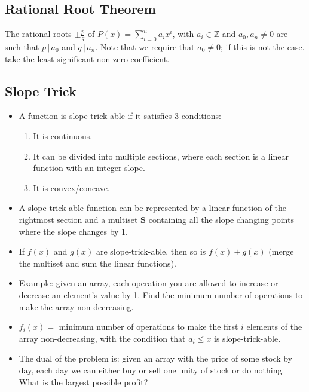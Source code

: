 \subsection{Rational Root Theorem}

The rational roots $\pm \frac p q$ of $P(x) = \sum_{i=0}^n a_i x^i$, with $a_i \in \mathbb Z$ and $a_0, a_n \neq 0$ are such that $p \,|\, a_0$ and $q \,|\, a_n$. Note that we require that $a_0 \neq 0$; if this is not the case. take the least significant non-zero coefficient.

\subsection{Slope Trick}

\begin{itemize}
    \item A function is slope-trick-able if it satisfies 3 conditions:


\begin{enumerate}
    \item It is continuous.
    \item It can be divided into multiple sections, where each section is a linear function with an integer slope.
    \item It is convex/concave. 
\end{enumerate}

\item A slope-trick-able function can be represented by a linear function of the rightmost section and a multiset \textbf{S} containing all the slope changing points where the slope changes by 1.

\item If $f(x)$ and $g(x)$ are slope-trick-able, then so is $f(x) + g(x)$ (merge the multiset and sum the linear functions).

\item Example: given an array, each operation you are allowed to increase or decrease an element's value by 1. Find the minimum number of operations to make the array non decreasing.   

\item $f_i(x) = $ minimum number of operations to make the first $i$ elements of the array non-decreasing, with the condition that $a_i \leq x$ is slope-trick-able.

\item  The dual of the problem is: given an array with the price of some stock by day, each day we can either buy or sell one unity of stock or do nothing. What is the largest possible profit?

\end{itemize}

